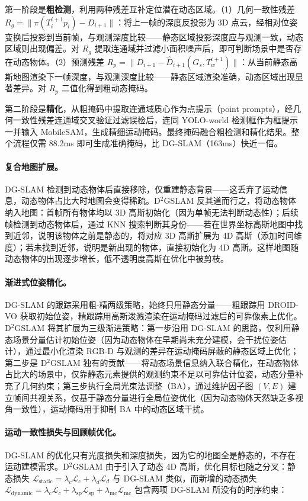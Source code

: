 第一阶段是\textbf{粗检测}，利用两种残差互补定位潜在动态区域。（1）几何一致性残差 $R_g = \| \pi(T_i^{i+1}p_i) - D_{i+1}\|$：将上一帧的深度反投影为 3D 点云，经相对位姿变换后投影到当前帧，与观测深度比较——静态区域投影深度应与观测一致，动态区域则出现偏差。对 $R_g$ 提取连通域并过滤小面积噪声后，即可判断场景中是否存在动态物体。（2）预测残差 $R_p = \|D_{i+1} - \hat{D}_{i+1}(G_s, T_w^{i+1})\|$：从当前静态高斯地图渲染下一帧深度，与观测深度比较——静态区域渲染准确，动态区域出现显著差异。对 $R_p$ 二值化得到粗动态掩码。

第二阶段是\textbf{精化}，从粗掩码中提取连通域质心作为点提示（point prompts），经几何一致性残差连通域交叉验证过滤误检后，连同 YOLO-world 检测框作为框提示一并输入 MobileSAM，生成精细运动掩码。最终掩码融合粗检测和精化结果。整个流程仅需 88.2ms 即可生成准确掩码，比 DG-SLAM（163ms）快近一倍。

\paragraph{复合地图扩展。}
DG-SLAM 检测到动态物体后直接移除，仅重建静态背景——这丢弃了运动信息，动态物体占比大时地图会变得稀疏。D$^2$GSLAM 反其道而行之，将动态物体纳入地图：首帧所有物体均以 3D 高斯初始化（因为单帧无法判断动态性）；后续帧检测到动态物体后，通过 KNN 搜索判断其身份——若在世界坐标高斯地图中找到近邻，说明该物体之前是静态的，将对应 3D 高斯扩展为 4D 高斯（添加时间维度）；若未找到近邻，说明是新出现的物体，直接初始化为 4D 高斯。这样地图随动态物体的出现逐步增长，低不透明度高斯在优化中被剪枝。

\paragraph{渐进式位姿精化。}
DG-SLAM 的跟踪采用粗-精两级策略，始终只用静态分量——粗跟踪用 DROID-VO 获取初始位姿，精跟踪用高斯泼溅渲染在运动掩码过滤后的可靠像素上优化。D$^2$GSLAM 将其扩展为三级渐进策略：第一步沿用 DG-SLAM 的思路，仅利用静态场景分量估计初始位姿（因为动态物体在早期尚未充分建模，会干扰位姿估计），通过最小化渲染 RGB-D 与观测的差异在运动掩码屏蔽的静态区域上优化；第二步是 D$^2$GSLAM 独有的贡献——将动态场景信息纳入联合精化，在动态物体占比大的场景中，仅靠静态元素提供的观测约束不足以可靠估计位姿，动态分量补充了几何约束；第三步执行全局光束法调整（BA），通过维护因子图 $(V, E)$ 建立帧间共视关系，仅基于静态分量进行全局位姿优化（因为动态物体天然缺乏多视角一致性），运动掩码用于抑制 BA 中的动态区域干扰。

\paragraph{运动一致性损失与回顾帧优化。}
DG-SLAM 的优化只有光度损失和深度损失，因为它的地图全是静态的，不存在运动建模需求。D$^2$GSLAM 由于引入了动态 4D 高斯，优化目标也随之分叉：静态损失 $\mathcal{L}_\text{static} = \lambda_c \mathcal{L}_c + \lambda_d \mathcal{L}_d$ 与 DG-SLAM 类似，而新增的动态损失 $\mathcal{L}_\text{dynamic} = \lambda_c \mathcal{L}_c + \lambda_\text{sp} \mathcal{L}_\text{sp} + \lambda_\text{mc} \mathcal{L}_\text{mc}$ 包含两项 DG-SLAM 所没有的时序约束：

